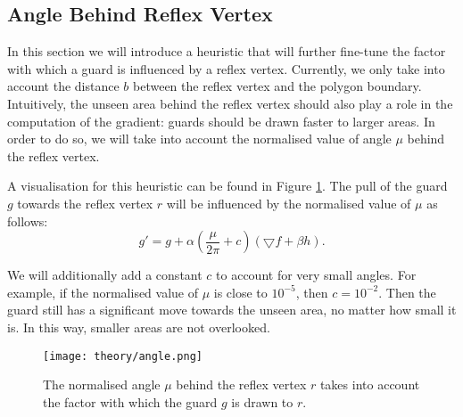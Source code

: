 \subsection{Angle Behind Reflex Vertex}
In this section we will introduce a heuristic that will further fine-tune the factor with which a guard is influenced by a reflex vertex. Currently, we only take into account the distance $b$ between the reflex vertex and the polygon boundary. Intuitively, the unseen area behind the reflex vertex should also play a role in the computation of the gradient: guards should be drawn faster to larger areas. In order to do so, we will take into account the normalised value of angle $\mu$ behind the reflex vertex.

A visualisation for this heuristic can be found in Figure \ref{fig:angle}. The pull of the guard $g$ towards the reflex vertex $r$ will be influenced by the normalised value of $\mu$ as follows: $$g' = g + \alpha (\frac{\mu}{2\pi} + c)(\bigtriangledown f + \beta h).$$

We will additionally add a constant $c$ to account for very small angles. For example, if the normalised value of $\mu$ is close to $10^{-5}$, then $c = 10^{-2}$. Then the guard still has a significant move towards the unseen area, no matter how small it is. In this way, smaller areas are not overlooked.

\begin{figure}[h!]
    \centering
    \texttt{[image: theory/angle.png]}
    \caption{The normalised angle $\mu$ behind the reflex vertex $r$ takes into account the factor with which the guard $g$ is drawn to $r$.}
    \label{fig:angle}
\end{figure}
